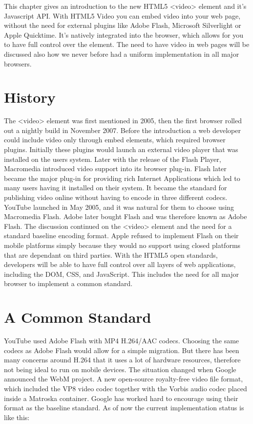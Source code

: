 
This chapter gives an introduction to the new HTML5 <video> element and it’s Javascript API. With HTML5 Video you can embed video into your web page, without the need for external plugins like Adobe Flash, Microsoft Silverlight or Apple Quicktime. It’s natively integrated into the browser, which allows for you to have full control over the element. The need to have video in web pages will be discussed also how we never before had a uniform implementation in all major browsers.

\section{History}
The <video> element was first mentioned in 2005, then the first browser rolled out a nightly build in November 2007. Before the introduction a web developer could include video only through  embed elements, which required browser plugins. Initially these plugins would launch an external video player that was installed on the users system. Later with the release of the Flash Player, Macromedia introduced video support into its browser plug-in. Flash later became the major plug-in for providing rich Internet Applications which led to many users having it installed on their system. It became the standard for publishing video online without having to encode in three different codecs. YouTube launched in May 2005, and it was natural for them to choose using Macromedia Flash. Adobe later bought Flash and was therefore known as Adobe Flash. The discussion continued on the <video> element and the need for a standard baseline encoding format. Apple refused to implement Flash on their mobile platforms simply because they would no support using closed platforms that are dependant on third parties. With the HTML5 open standards, developers will be able to have full control over all layers of web applications, including the DOM, CSS, and JavaScript. This includes the need for all major browser to implement a common standard.

\section{A Common Standard}
YouTube used Adobe Flash with MP4 H.264/AAC codecs. Choosing the same codecs as Adobe Flash would allow for a simple migration. But there has been many concerns around H.264 that it uses a lot of hardware resources, therefore not being ideal to run on mobile devices. The situation changed when Google announced the WebM project. A new open-source royalty-free video file format, which included the VP8 video codec together with the Vorbis audio codec placed inside a Matroska container. Google has worked hard to encourage using their format as the baseline standard. As of now the current implementation status is like this:

